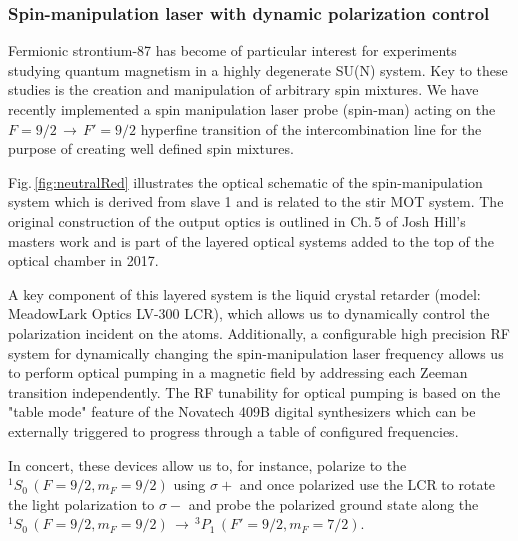 \subsubsection{Spin-manipulation laser with dynamic polarization control}
Fermionic strontium-87 has become of particular interest for experiments studying quantum magnetism in a highly degenerate SU(N) system.
Key to these studies is the creation and manipulation of arbitrary spin mixtures.
We have recently implemented a spin manipulation laser probe (spin-man) acting on the $F=9/2\,\rightarrow\,F'=9/2$ hyperfine transition of the intercombination line for the purpose of creating well defined spin mixtures.

Fig.\,\ref{fig:neutralRed} illustrates the optical schematic of the spin-manipulation system which is derived from slave 1 and is related to the stir MOT system.
The original construction of the output optics is outlined in Ch.\,5 of Josh Hill's masters work \cite{Hill2017} and is part of the layered optical systems added to the top of the optical chamber in 2017.

A key component of this layered system is the liquid crystal retarder (model: MeadowLark Optics LV-300 LCR), which allows us to dynamically control the polarization incident on the atoms.
Additionally, a configurable high precision RF system for dynamically changing the spin-manipulation laser frequency allows us to perform optical pumping in a magnetic field by addressing each Zeeman transition independently.
The RF tunability for optical pumping is based on the "table mode" feature of the Novatech 409B digital synthesizers which can be externally triggered to progress through a table of configured frequencies.

In concert, these devices allow us to, for instance, polarize to the $^1S_0\,(F=9/2, m_F=9/2)$ using $\sigma+$ and once polarized use the LCR to rotate the light polarization to $\sigma-$ and probe the polarized ground state along the $^1S_0\,(F=9/2,m_F=9/2)\,\rightarrow\,^3P_1\,(F'=9/2,m_F=7/2)$.


